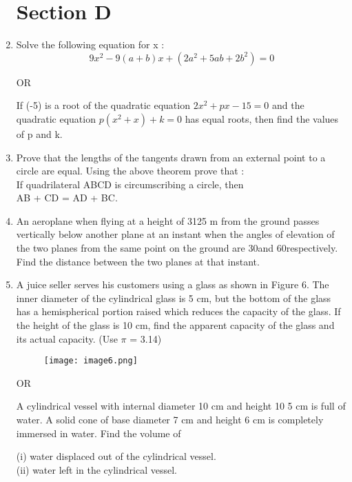 \documentclass[journal,12pt,twocolumn]{IEEEtran}
\begin{document}
\begin{enumerate}
\section{\textbf{Section D}}
\item Solve the following equation for x :
\begin{equation}
    9x^2 - 9(a+b)x + (2a^2+5ab+2b^2) = 0 \nonumber
\end{equation}
\begin{center}
    OR
\end{center}
If (-5) is a root of the quadratic equation $2x^2 + px -15  =  0$ and the quadratic equation  $p(x^2 + x) + k = 0 $ has equal roots, then find the values of p and k.\\
\item Prove that the lengths of the tangents drawn from an external point to a circle are equal.
Using the above theorem prove that :\\
If quadrilateral ABCD is circumscribing a circle, then\\
AB + CD = AD + BC. \\
\item An  aeroplane  when  flying  at  a  height  of  3125  m  from  the  ground passes vertically below another plane at an instant when the angles of elevation of the two planes from the same point on the ground are 30\degree and 60\degree respectively. Find the distance between the two planes at that instant.
\item A juice seller serves his customers using a glass as shown in Figure 6. The inner diameter of the cylindrical glass is 5 cm, but the bottom of the glass has a hemispherical portion raised which reduces the capacity of  the  glass.  If  the  height  of the  glass  is  10  cm,  find  the  apparent capacity of the glass and its actual capacity. (Use $\pi$ = 3.14)
\begin{figure}[h!]
    \centering
    \texttt{[image: image6.png]}
 \end{figure}
\begin{center}
OR
\end{center}
A cylindrical vessel with internal diameter 10 cm and height 10 5 cm is full of water. A solid cone of base diameter 7 cm and height 6 cm is completely immersed in water. Find the volume of
\begin{enumerate}
    (i) water displaced out of the cylindrical vessel.\\
    (ii) water left in the cylindrical vessel.
\end{enumerate}

\end{enumerate}
\end{document}
